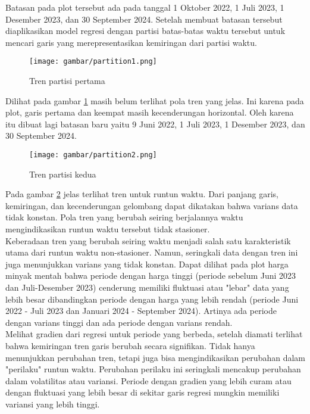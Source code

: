 \documentclass[a4paper,12pt]{article}
\begin{document}
Batasan pada plot tersebut ada pada tanggal 1 Oktober 2022, 1 Juli 2023, 1 Desember 2023, dan 30 September 2024. Setelah membuat batasan tersebut diaplikasikan model regresi dengan partisi batas-batas waktu tersebut untuk mencari garis yang merepresentasikan kemiringan dari partisi waktu.

\begin{figure}[htb!]
    \centering
    \texttt{[image: gambar/partition1.png]}
    \caption{Tren partisi pertama}
    \label{fig:partisi1}
\end{figure}

Dilihat pada gambar \ref{fig:partisi1} masih belum terlihat pola tren yang jelas. Ini karena pada plot, garis pertama dan keempat masih kecenderungan horizontal. Oleh karena itu dibuat lagi batasan baru yaitu 9 Juni 2022, 1 Juli 2023, 1 Desember 2023, dan 30 September 2024. 

\begin{figure}[htb!]
    \centering
    \texttt{[image: gambar/partition2.png]}
    \caption{Tren partisi kedua}
    \label{fig:partisi2}
\end{figure}

Pada gambar \ref{fig:partisi2} jelas terlihat tren untuk runtun waktu. Dari panjang garis, kemiringan, dan kecenderungan gelombang dapat dikatakan bahwa varians data tidak konstan. Pola tren yang berubah seiring berjalannya waktu mengindikasikan runtun waktu tersebut tidak stasioner. \\

Keberadaan tren yang berubah seiring waktu menjadi salah satu karakteristik utama dari runtun waktu non-stasioner. Namun, seringkali data dengan tren ini juga menunjukkan varians yang tidak konstan. Dapat dilihat pada plot harga minyak mentah bahwa periode dengan harga tinggi (periode sebelum Juni 2023 dan Juli-Desember 2023) cenderung memiliki fluktuasi atau "lebar" data yang lebih besar dibandingkan periode dengan harga yang lebih rendah (periode Juni 2022 - Juli 2023 dan Januari 2024 - September 2024). Artinya ada periode dengan varians tinggi dan ada periode dengan varians rendah. \\

Melihat gradien dari regresi untuk periode yang berbeda, setelah diamati terlihat bahwa kemiringan tren garis berubah secara signifikan. Tidak hanya menunjukkan perubahan tren, tetapi juga bisa mengindikasikan perubahan dalam "perilaku" runtun waktu. Perubahan perilaku ini seringkali mencakup perubahan dalam volatilitas atau variansi. Periode dengan gradien yang lebih curam atau dengan fluktuasi yang lebih besar di sekitar garis regresi mungkin memiliki variansi yang lebih tinggi.
\end{document}
